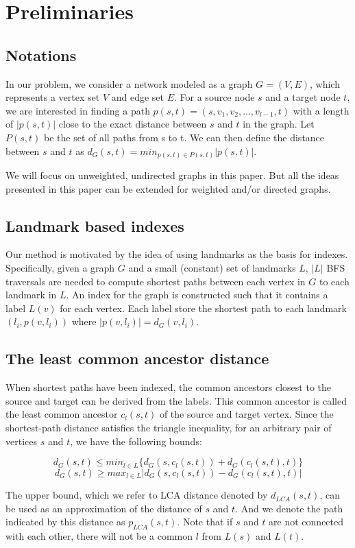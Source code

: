 \section{Preliminaries}
\label{preliminary}

\subsection{Notations}
In our problem, we consider a network modeled as a graph $G = (V,E)$, which represents a vertex set $V$ and edge set $E$. For a source node $s$ and a target node $t$, we are interested in finding a path $p(s,t)=(s,v_1,v_2,...,v_{l-1},t)$ with a length of $|p(s,t)|$ close to the exact distance between $s$ and $t$ in the graph. Let $P(s,t)$ be the set of all paths from s to t. We can then define the distance between $s$ and $t$ as $d_G(s,t) = min_{p(s,t) \in P(s,t)}|p(s,t)|$.

We will focus on unweighted, undirected graphs in this paper. But all the ideas presented in this paper can be extended for weighted and/or directed graphs.

\subsection{Landmark based indexes}

Our method is motivated by the idea of using landmarks as the basis for indexes. Specifically, given a graph $G$ and a small (constant) set of landmarks $L$, $|L|$ BFS traversals are needed to compute shortest paths between each vertex in $G$ to each landmark in $L$. An index for the graph is constructed such that it contains a label $L(v)$ for each vertex. Each label store the shortest path to each landmark $(l_i, p(v,l_i))$ where $|p(v,l_i)| = d_G(v,l_i)$.

\subsection{The least common ancestor distance}

When shortest paths have been indexed, the common ancestors closest to the source and target can be derived from the labels. This common ancestor is called the least common ancestor $c_l(s,t)$ of the source and target vertex. Since the shortest-path distance satisfies the triangle inequality, for an arbitrary pair of vertices $s$ and $t$, we have the following bounds:

\begin{equation}
\label{equ:upper}
    d_G(s,t) \leq min_{l \in L}\{d_G(s,c_l(s,t)) + d_G(c_l(s,t),t)\}
\end{equation}
\begin{equation}
\label{equ:lower}
    d_G(s,t) \geq max_{l \in L}|d_G(s,c_l(s,t)) - d_G(c_l(s,t),t)|
\end{equation}

The upper bound, which we refer to LCA distance denoted by $d_{LCA}(s,t)$, can be used as an approximation of the distance of $s$ and $t$. And we denote the path indicated by this distance as $p_{LCA}(s,t)$. Note that if $s$ and $t$ are not connected with each other, there will not be a common $l$ from $L(s)$ and $L(t)$.
